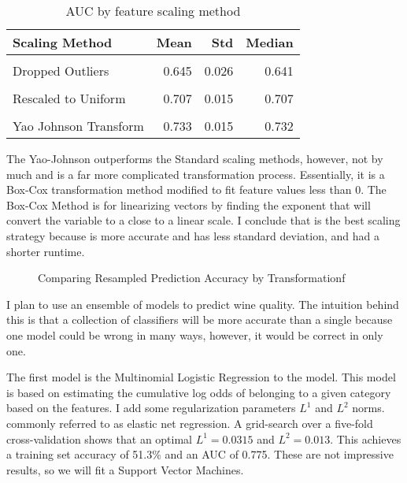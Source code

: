 \documentclass[16pt,twocolumn,letterpaper,titlepage]{article}
\begin{document}
\begin{table}[!h]

\caption{AUC by feature scaling method}
\centering
\begin{tabular}[t]{lrrr}
\toprule
Scaling Method & Mean & Std & Median\\
\midrule
\cellcolor{gray!6}{No Transformation} & \cellcolor{gray!6}{0.590} & \cellcolor{gray!6}{0.024} & \cellcolor{gray!6}{0.592}\\
Dropped Outliers & 0.645 & 0.026 & 0.641\\
\cellcolor{gray!6}{Min Max Scale} & \cellcolor{gray!6}{0.690} & \cellcolor{gray!6}{0.018} & \cellcolor{gray!6}{0.691}\\
Rescaled to Uniform & 0.707 & 0.015 & 0.707\\
\cellcolor{gray!6}{Standard Scale} & \cellcolor{gray!6}{0.726} & \cellcolor{gray!6}{0.017} & \cellcolor{gray!6}{0.725}\\
\addlinespace
Yao Johnson Transform & 0.733 & 0.015 & 0.732\\
\bottomrule
\end{tabular}
\end{table}

The Yao-Johnson outperforms the Standard scaling methods, however, not by much and is a far more complicated transformation process. Essentially, it is a Box-Cox transformation method modified to fit feature values less than 0. The Box-Cox Method is for linearizing vectors by finding the exponent that will convert the variable to a close to a linear scale. I conclude that is the best scaling strategy because is more accurate and has less standard deviation, and had a shorter runtime. 

\begin{figure}[!htb]
	\caption{\label{fig:my-label} Comparing Resampled Prediction Accuracy by Transformationf}
\end{figure}
 
I plan to use an ensemble of models to predict wine quality. The intuition behind this is that a collection of classifiers will be more accurate than a single because one model could be wrong in many ways, however, it would be correct in only one.

The first model is the Multinomial Logistic Regression to the model. This model is based on estimating the cumulative log odds of belonging to a given category based on the features. I add some regularization parameters $L^1$ and $L^2$ norms. commonly referred to as elastic net regression. A grid-search over a five-fold cross-validation shows that an optimal $L^1 = 0.0315$ and $L^2 = 0.013$. This achieves a training set accuracy of 51.3\% and an AUC of 0.775. These are not impressive results, so we will fit a Support Vector Machines. 
\end{document}
